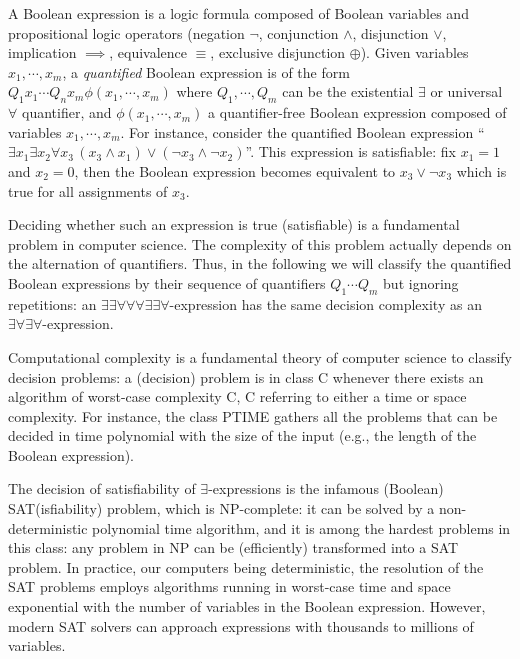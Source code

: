 \documentclass[PCJ,Unicode,screen,mode=plain]{cedram}
\begin{document}
A Boolean expression is a logic formula composed of Boolean variables
and propositional logic operators (negation \(\neg\), conjunction
\(\wedge\), disjunction \(\vee\), implication \(\implies\), equivalence
\(\equiv\), exclusive disjunction \(\oplus\)). Given variables
\(x_1,\cdots,x_m\), a \emph{quantified} Boolean expression is of the
form \(Q_1 x_1 \cdots Q_n x_m \phi(x_1, \cdots, x_m)\) where
\(Q_1, \cdots, Q_m\) can be the existential \(\exists\) or universal
\(\forall\) quantifier, and \(\phi(x_1,\cdots,x_m)\) a quantifier-free
Boolean expression composed of variables \(x_1, \cdots, x_m\). For
instance, consider the quantified Boolean expression
``\(\exists x_1\exists x_2 \forall x_3\, (x_3 \wedge x_1) \vee (\neg x_3 \wedge \neg x_2)\)''.
This expression is satisfiable: fix \(x_1=1\) and \(x_2=0\), then the
Boolean expression becomes equivalent to \(x_3 \vee \neg x_3\) which is
true for all assignments of \(x_3\).

Deciding whether such an expression is true (satisfiable) is a
fundamental problem in computer science. The complexity of this problem
actually depends on the alternation of quantifiers. Thus, in the
following we will classify the quantified Boolean expressions by their
sequence of quantifiers \(Q_1\cdots Q_m\) but ignoring repetitions: an
\(\exists\exists\forall\forall\forall\exists\exists\forall\)-expression
has the same decision complexity as an
\(\exists\forall\exists\forall\)-expression.

Computational complexity \citep{Papadimitriou} is a fundamental theory
of computer science to classify decision problems: a (decision) problem
is in class C whenever there exists an algorithm of worst-case
complexity C, C referring to either a time or space complexity. For
instance, the class PTIME gathers all the problems that can be decided
in time polynomial with the size of the input (e.g., the length of the
Boolean expression).

The decision of satisfiability of \(\exists\)-expressions is the
infamous (Boolean) SAT(isfiability) problem, which is NP-complete: it
can be solved by a non-deterministic polynomial time algorithm, and it
is among the hardest problems in this class: any problem in NP can be
(efficiently) transformed into a SAT problem. In practice, our computers
being deterministic, the resolution of the SAT problems employs
algorithms running in worst-case time and space exponential with the
number of variables in the Boolean expression. However, modern SAT
solvers can approach expressions with thousands to millions of
variables.
\end{document}
